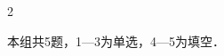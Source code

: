 \documentclass[fontset=none]{ctexart}
\begin{document}
\begin{multicols}{2}
\begin{ketang}{本组共5题，1—3为单选，4—5为填空．}
\begin{ansblock}[导-课时08-评5]
\end{ansblock}

\end{ketang}

\end{multicols}

\tailfill
\end{document}
